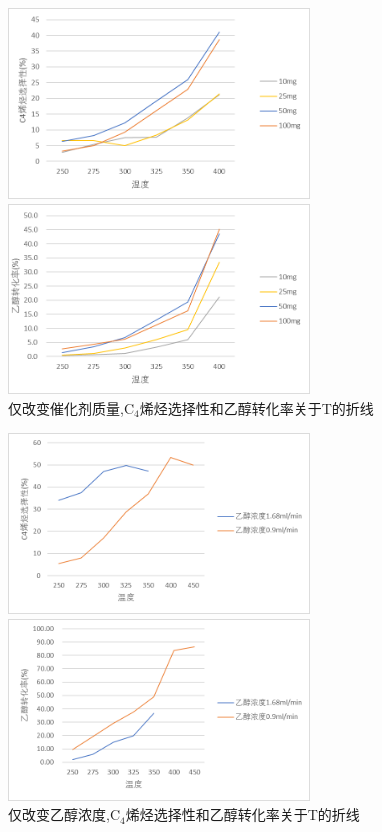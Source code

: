 \documentclass[a4paper,10.5pt]{ctexart}
\begin{document}
\begin{figure}[h]
\centering
\begin{minipage}[t]{0.48\textwidth}
\centering
\includegraphics[width=8cm]{一比一不同质量C4.png}
\end{minipage}
\begin{minipage}[t]{0.48\textwidth}
\centering
\includegraphics[width=8cm]{一比一不同质量乙醇.png}
\end{minipage}
\caption{\centering 仅改变催化剂质量,C$_4$烯烃选择性和乙醇转化率关于T的折线}
\end{figure}

\begin{figure}[h]
\centering
\begin{minipage}[t]{0.48\textwidth}
\centering
\includegraphics[width=8cm]{200200与1wt乙醇浓度C4.png}
\end{minipage}
\begin{minipage}[t]{0.48\textwidth}
\centering
\includegraphics[width=8cm]{200200与1wt乙醇浓度乙醇.png}
\end{minipage}
\caption{\centering 仅改变乙醇浓度,C$_4$烯烃选择性和乙醇转化率关于T的折线}
\end{figure}
\end{document}
